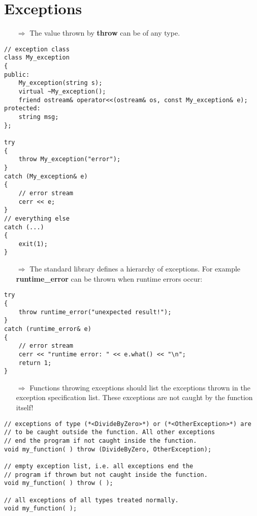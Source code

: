 \documentclass[10pt]{article}
\begin{document}
\section{Exceptions}
\small
\begin{enumerate}
\item[$\Rightarrow$] The value thrown by
\textbf{throw} can be of any type.
\end{enumerate}
\begin{lstlisting}
// exception class
class My_exception
{
public:
    My_exception(string s);
    virtual ~My_exception();
    friend ostream& operator<<(ostream& os, const My_exception& e);
protected:
    string msg;
};

try
{
    throw My_exception("error");
}
catch (My_exception& e)
{
    // error stream
    cerr << e;
}
// everything else
catch (...)
{
    exit(1);
}
\end{lstlisting}
\begin{enumerate}
\item[$\Rightarrow$] The standard library defines a hierarchy of exceptions.  For example \textbf{runtime\_error} can be 
thrown when runtime errors occur:
\end{enumerate}
\begin{lstlisting}
try
{
    throw runtime_error("unexpected result!");
}
catch (runtime_error& e)
{
    // error stream
    cerr << "runtime error: " << e.what() << "\n";
    return 1;
}
\end{lstlisting}
\begin{enumerate}
\item[$\Rightarrow$] Functions throwing exceptions should list the exceptions thrown in
the exception specification list. These exceptions are not 
caught by the function itself!
\end{enumerate}
\begin{lstlisting}
// exceptions of type (*<DivideByZero>*) or (*<OtherException>*) are
// to be caught outside the function. All other exceptions 
// end the program if not caught inside the function.
void my_function( ) throw (DivideByZero, OtherException);

// empty exception list, i.e. all exceptions end the
// program if thrown but not caught inside the function.
void my_function( ) throw ( );

// all exceptions of all types treated normally.
void my_function( );
\end{lstlisting}
%
%
\end{document}
